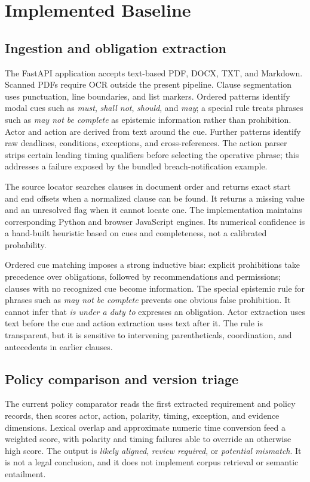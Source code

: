 \documentclass[11pt,a4paper]{article}
\begin{document}
\section{Implemented Baseline}
\subsection{Ingestion and obligation extraction}
The FastAPI application accepts text-based PDF, DOCX, TXT, and Markdown. Scanned PDFs require OCR outside the present pipeline. Clause segmentation uses punctuation, line boundaries, and list markers. Ordered patterns identify modal cues such as \emph{must}, \emph{shall not}, \emph{should}, and \emph{may}; a special rule treats phrases such as \emph{may not be complete} as epistemic information rather than prohibition. Actor and action are derived from text around the cue. Further patterns identify raw deadlines, conditions, exceptions, and cross-references. The action parser strips certain leading timing qualifiers before selecting the operative phrase; this addresses a failure exposed by the bundled breach-notification example.

The source locator searches clauses in document order and returns exact start and end offsets when a normalized clause can be found. It returns a missing value and an unresolved flag when it cannot locate one. The implementation maintains corresponding Python and browser JavaScript engines. Its numerical confidence is a hand-built heuristic based on cues and completeness, not a calibrated probability.

Ordered cue matching imposes a strong inductive bias: explicit prohibitions take precedence over obligations, followed by recommendations and permissions; clauses with no recognized cue become information. The special epistemic rule for phrases such as \emph{may not be complete} prevents one obvious false prohibition. It cannot infer that \emph{is under a duty to} expresses an obligation. Actor extraction uses text before the cue and action extraction uses text after it. The rule is transparent, but it is sensitive to intervening parentheticals, coordination, and antecedents in earlier clauses.

\subsection{Policy comparison and version triage}
The current policy comparator reads the first extracted requirement and policy records, then scores actor, action, polarity, timing, exception, and evidence dimensions. Lexical overlap and approximate numeric time conversion feed a weighted score, with polarity and timing failures able to override an otherwise high score. The output is \emph{likely aligned}, \emph{review required}, or \emph{potential mismatch}. It is not a legal conclusion, and it does not implement corpus retrieval or semantic entailment.
\end{document}
